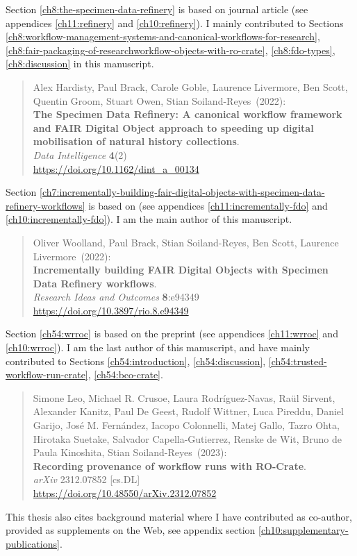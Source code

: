 Section \ref{ch8:the-specimen-data-refinery} is based on journal article \cite{Hardisty 2022} (see appendices \ref{ch11:refinery} and \ref{ch10:refinery}). I mainly contributed to Sections \ref{ch8:workflow-management-systems-and-canonical-workflows-for-research}, \ref{ch8:fair-packaging-of-researchworkflow-objects-with-ro-crate}, \ref{ch8:fdo-types}, \ref{ch8:discussion} in this manuscript.

\begin{quote}
    \small
    Alex Hardisty, Paul Brack, Carole Goble, Laurence Livermore, Ben Scott, Quentin Groom, Stuart Owen, Stian Soiland-Reyes~(2022): \\
    \textbf{The Specimen Data Refinery: A canonical workflow framework and FAIR Digital Object approach to speeding up digital mobilisation of natural history collections}.\\
    \emph{Data Intelligence} \textbf{4}(2)\\
    \url{https://doi.org/10.1162/dint_a_00134}    
\end{quote}

Section \ref{ch7:incrementally-building-fair-digital-objects-with-specimen-data-refinery-workflows} is based on \cite{Woolland 2022} (see appendices \ref{ch11:incrementally-fdo} and \ref{ch10:incrementally-fdo}). I am the main author of this manuscript.

\begin{quote}
    \small
    Oliver Woolland, Paul Brack, Stian Soiland-Reyes, Ben Scott, Laurence Livermore~(2022): \\
    \textbf{Incrementally building FAIR Digital Objects with Specimen Data Refinery workflows}.\\
    \emph{Research Ideas and Outcomes} \textbf{8}:e94349\\
    \url{https://doi.org/10.3897/rio.8.e94349}    
\end{quote}

Section \ref{ch54:wrroc} is based on the preprint \cite{Leo 2023b} (see appendices \ref{ch11:wrroc} and \ref{ch10:wrroc}). I am the last author of this manuscript, and have mainly contributed to Sections \ref{ch54:introduction}, \ref{ch54:discussion}, \ref{ch54:trusted-workflow-run-crate}, \ref{ch54:bco-crate}.

\begin{quote}
    \small
    Simone Leo, Michael R. Crusoe, Laura Rodríguez-Navas, Raül Sirvent, Alexander Kanitz, Paul De Geest, Rudolf Wittner, Luca Pireddu, Daniel Garijo, José M. Fernández, Iacopo Colonnelli, Matej Gallo, Tazro Ohta, Hirotaka Suetake, Salvador Capella-Gutierrez, Renske de Wit, Bruno de Paula Kinoshita, Stian Soiland-Reyes~(2023): \\
    \textbf{Recording provenance of workflow runs with RO-Crate}.\\
    \emph{arXiv} 2312.07852 [cs.DL] \\
    \url{https://doi.org/10.48550/arXiv.2312.07852}\\
\end{quote}

This thesis also cites background material where I have contributed as co-author, provided as supplements on the Web, see appendix section \vref{ch10:supplementary-publications}.